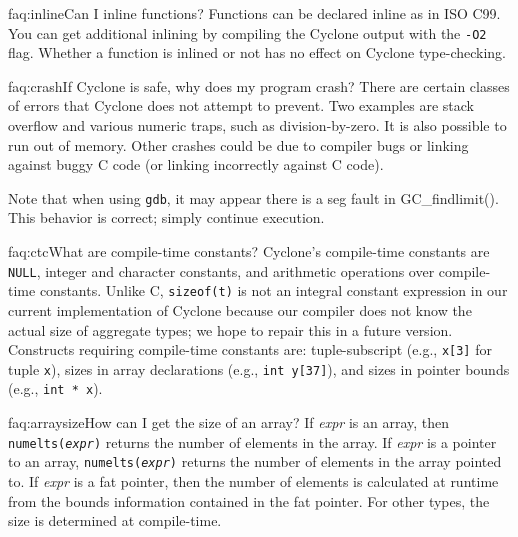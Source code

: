 \begin{faqa}{faq:inline}{Can I inline functions?}
Functions can be declared inline as in ISO C99.  You can get additional
inlining by compiling the Cyclone output with the \texttt{-O2} flag.
Whether a function is inlined or not has no effect on Cyclone
type-checking.
\end{faqa}

\begin{faqa}{faq:crash}{If Cyclone is safe, why does my program crash?}
There are certain classes of errors that Cyclone does not attempt to
prevent.  Two examples are stack overflow and various numeric traps,
such as division-by-zero.  It is also possible to run out of memory.
Other crashes could be due to compiler bugs or linking against buggy C
code (or linking incorrectly against C code).

Note that when using \texttt{gdb}, it may appear there is a seg fault
in GC_findlimit().  This behavior is correct; simply continue
execution.
\end{faqa}

\begin{faqa}{faq:ctc}{What are compile-time constants?}
Cyclone's compile-time constants are \texttt{NULL}, integer and
character constants, and arithmetic operations over compile-time
constants.  Unlike C, \texttt{sizeof(t)} is not an integral constant
expression in our current implementation of Cyclone because our
compiler does not know the actual size of aggregate types; we hope to
repair this in a future version.  Constructs requiring compile-time
constants are: tuple-subscript (e.g., \texttt{x[3]} for tuple
\texttt{x}), sizes in array declarations (e.g., \texttt{int y[37]}),
and sizes in pointer bounds (e.g., \texttt{int * x\rb}).
\end{faqa}

\begin{faqa}{faq:arraysize}{How can I get the size of an array?}
If \textit{expr} is an array, then \texttt{numelts({\it expr})} returns
the number of elements in the array.  If \textit{expr} is a pointer to
an array, \texttt{numelts({\it expr})} returns the number of elements
in the array pointed to.  If \textit{expr} is a fat pointer, then the
number of elements is calculated at runtime from the bounds
information contained in the fat pointer.  For other types, the size
is determined at compile-time.
\end{faqa}

